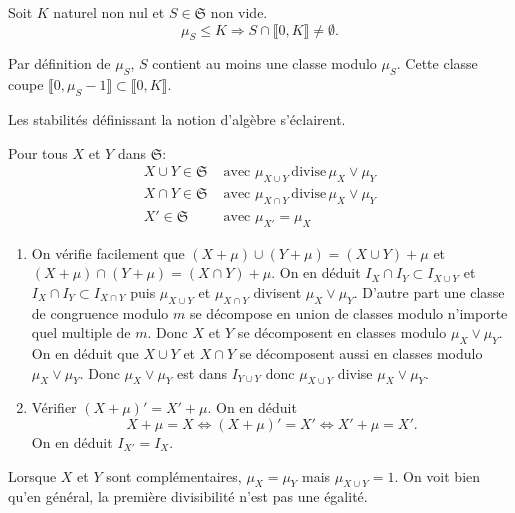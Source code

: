 \begin{propn} \label{muInfK}
 Soit $K$ naturel non nul et $S \in \mathfrak{S}$ non vide.
 \begin{displaymath}
  \mu_S \leq K \Rightarrow S \cap \llbracket 0, K \rrbracket \neq \emptyset.
 \end{displaymath}
\end{propn}
\begin{demo}
Par définition de $\mu_S$, $S$ contient au moins une classe modulo $\mu_S$. Cette classe coupe $\llbracket 0, \mu_S -1 \rrbracket \subset \llbracket 0, K \rrbracket$.
\end{demo}

Les stabilités définissant la notion d'algèbre s'éclairent.
\begin{propn}
  Pour tous $X$ et $Y$ dans $\mathfrak{S}$:
\begin{align*}
  X \cup Y \in \mathfrak{S} &\text{ avec } \mu_{X\cup Y} \,\mathrm{ divise } \, \mu_X \vee \mu_Y  \\
  X \cap Y \in \mathfrak{S} &\text{ avec } \mu_{X\cap Y} \,\mathrm{ divise } \,  \mu_X \vee \mu_Y \\
  X' \in \mathfrak{S} &\text{ avec } \mu_{X'} = \mu_X
\end{align*}
\end{propn}
\begin{demo}
  \begin{enumerate}
    \item On vérifie facilement que $(X+\mu) \cup (Y+\mu) = (X\cup Y) + \mu$ et $(X+\mu) \cap (Y+\mu) = (X\cap Y) + \mu$. On en déduit $I_X \cap I_Y \subset I_{X\cup Y}$ et $I_X \cap I_Y \subset I_{X\cap Y}$ puis $\mu_{X\cup Y}$ et $\mu_{X\cap Y}$ divisent $\mu_X \vee \mu_Y$.\newline
    D'autre part une classe de congruence modulo $m$ se décompose en union de classes modulo n'importe quel multiple de $m$. Donc $X$ et $Y$ se décomposent en classes modulo $\mu_X \vee \mu_Y$. On en déduit que $X\cup Y$ et $X\cap Y$ se décomposent aussi en classes modulo $\mu_X \vee \mu_Y$. Donc $\mu_X \vee \mu_Y$ est dans $I_{Y\cup Y}$ donc $\mu_{X\cup Y}$ divise $\mu_X \vee \mu_Y$.
    \item Vérifier $(X + \mu)' = X' + \mu$. On en déduit
\begin{displaymath}
  X + \mu = X \Leftrightarrow (X+ \mu)' = X' \Leftrightarrow X' + \mu = X'.
\end{displaymath}
On en déduit $I_{X'} = I_X$.
  \end{enumerate}
\end{demo}
\begin{rem}
 Lorsque $X$ et $Y$ sont complémentaires, $\mu_X = \mu_Y$ mais $\mu_{X\cup Y} = 1$. On voit bien qu'en général, la première divisibilité n'est pas une égalité.
\end{rem}

